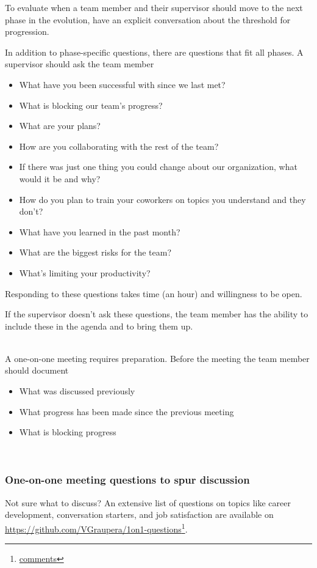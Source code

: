 To evaluate when a team member and their supervisor should move to the next phase in the evolution, have an explicit conversation about the threshold for progression.


In addition to phase-specific questions, there are questions that fit all phases. A supervisor should ask the team member
\begin{itemize}
    \item What have you been successful with since we last met?
    \item What is blocking our team's progress?
    \item What are your plans?
    \item How are you collaborating with the rest of the team?
    \item If there was just one thing you could change about our organization, what would it be and why?
    \item How do you plan to train your coworkers on topics you understand and they don't?
    \item What have you learned in the past month?
    \item What are the biggest risks for the team?
    \item What's limiting your productivity?
\end{itemize}
Responding to these questions takes time (an hour) and willingness to be open. 

If the supervisor doesn't ask these questions, the team member has the ability to include these in the agenda and to bring them up. 


\ \\

A one-on-one meeting requires preparation. Before the meeting the team member should document
\begin{itemize}
    \item What was discussed previously
    \item What progress has been made since the previous meeting
    \item What is blocking progress
\end{itemize}




\ \\

\subsubsection*{One-on-one meeting questions to spur discussion}

Not sure what to discuss? An extensive list of questions on topics like career development, conversation starters, and job satisfaction are available on \href{https://github.com/VGraupera/1on1-questions}{https://github.com/VGraupera/1on1-questions}\footnote{\href{https://news.ycombinator.com/item?id=22341138}{comments}}.